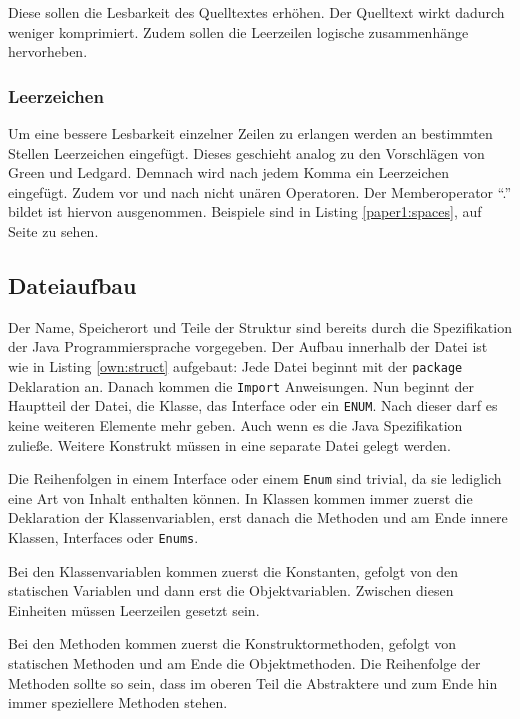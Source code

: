 Diese sollen die Lesbarkeit des Quelltextes erhöhen. Der Quelltext wirkt dadurch weniger komprimiert. Zudem sollen die Leerzeilen logische zusammenhänge hervorheben.

\subsubsection{Leerzeichen}

Um eine bessere Lesbarkeit einzelner Zeilen zu erlangen werden an bestimmten Stellen Leerzeichen eingefügt. Dieses geschieht analog zu den Vorschlägen von Green und Ledgard\cite[S. 7]{Green}. Demnach wird nach jedem Komma ein Leerzeichen eingefügt. Zudem vor und nach nicht unären Operatoren. Der Memberoperator \enquote{.} bildet ist hiervon ausgenommen. Beispiele sind in Listing \ref{paper1:spaces}, auf Seite \pageref{paper1:spaces} zu sehen.

\subsection{Dateiaufbau}
Der Name, Speicherort und Teile der Struktur sind bereits durch die Spezifikation der Java Programmiersprache vorgegeben. Der Aufbau innerhalb der Datei ist wie in Listing \ref{own:struct}  aufgebaut: Jede Datei beginnt mit der \texttt{package} Deklaration an. Danach kommen die \texttt{Import} Anweisungen. Nun beginnt der Hauptteil der Datei, die Klasse, das Interface oder ein \texttt{ENUM}. Nach dieser darf es keine weiteren Elemente mehr geben. Auch wenn es die Java Spezifikation zuließe. Weitere Konstrukt müssen in eine separate Datei gelegt werden.

Die Reihenfolgen in einem Interface oder einem \texttt{Enum} sind trivial, da sie lediglich eine Art von Inhalt enthalten können. In Klassen kommen immer zuerst die Deklaration der Klassenvariablen, erst danach die Methoden und am Ende innere Klassen, Interfaces oder \texttt{Enums}.

Bei den Klassenvariablen kommen zuerst die Konstanten, gefolgt von den statischen Variablen und dann erst die Objektvariablen. Zwischen diesen Einheiten müssen Leerzeilen gesetzt sein.

Bei den Methoden kommen zuerst die Konstruktormethoden, gefolgt von statischen Methoden und am Ende die Objektmethoden. Die Reihenfolge der Methoden sollte so sein, dass im oberen Teil die Abstraktere und zum Ende hin immer speziellere Methoden stehen.

